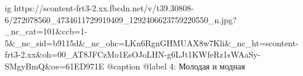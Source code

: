  
 
 
 
 

\ifcmt
  ig https://scontent-frt3-2.xx.fbcdn.net/v/t39.30808-6/272078560_4734611729919409_1292406623759220550_n.jpg?_nc_cat=101&ccb=1-5&_nc_sid=b9115d&_nc_ohc=LKn6RgnGHMUAX8w7Kli&_nc_ht=scontent-frt3-2.xx&oh=00_AT8JFCzMo1EsOJoLHN-g6LJt1KWfeRz1sWAaSy-SMgyBmQ&oe=61ED971E
  @caption @label 4: Молодая и модная
\fi
